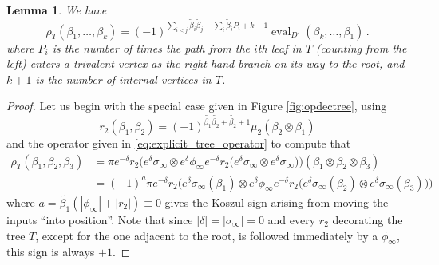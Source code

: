 \documentclass[english,letter paper,12pt,leqno]{article}
\newtheorem{lemma}[theorem]{Lemma}
\theoremstyle{example}
\numberwithin{equation}{section}
\def\be{\begin{equation}}
\def\ee{\end{equation}}
\begin{document}
\begin{lemma}\label{prop:replacer2} We have
\be\label{eq:proprhoT}
\rho_T( \beta_1, \ldots, \beta_k ) = (-1)^{\sum_{i < j} \widetilde{\beta}_i \widetilde{\beta}_j + \sum_i \widetilde{\beta}_i P_i + k + 1} \operatorname{eval}_{D'}( \beta_k, \ldots, \beta_1 )\,.
\ee
where $P_i$ is the number of times the path from the $i$th leaf in $T$ (counting from the left) enters a trivalent vertex as the right-hand branch on its way to the root, and $k+1$ is the number of internal vertices in $T$.
\end{lemma}
\begin{proof}
Let us begin with the special case given in Figure \ref{fig:opdectree}, using
\be\label{eq:mu2vsr2_v2}
r_2( \beta_1, \beta_2 ) = (-1)^{\widetilde{\beta_1} \widetilde{\beta_2} + \widetilde{\beta_2} + 1}
\mu_2(\beta_2 \otimes \beta_1)
\ee
and the operator given in \eqref{eq:explicit_tree_operator} to compute that
\begin{align*}
\rho_T( \beta_1, \beta_2, \beta_3 ) &= \pi e^{-\delta} r_2\Big( e^{\delta}\sigma_\infty \otimes e^{\delta} \phi_\infty e^{-\delta} r_2\Big( e^{\delta} \sigma_\infty \otimes e^{\delta} \sigma_\infty \Big) \Big)( \beta_1 \otimes \beta_2 \otimes \beta_3 )\\
&= (-1)^{a} \pi e^{-\delta} r_2\Big( e^{\delta}\sigma_\infty(\beta_1) \otimes e^{\delta} \phi_\infty e^{-\delta} r_2\Big( e^{\delta} \sigma_\infty(\beta_2) \otimes e^{\delta} \sigma_\infty(\beta_3) \Big) \Big)
\end{align*}
where $a = \widetilde{\beta_1}( |\phi_\infty| + |r_2| ) \equiv 0$ gives the Koszul sign arising from moving the inputs ``into position''. Note that since $|\delta| = |\sigma_\infty| = 0$ and every $r_2$ decorating the tree $T$, except for the one adjacent to the root, is followed immediately by a $\phi_\infty$, this sign is always $+1$.


\end{proof}
\end{document}
